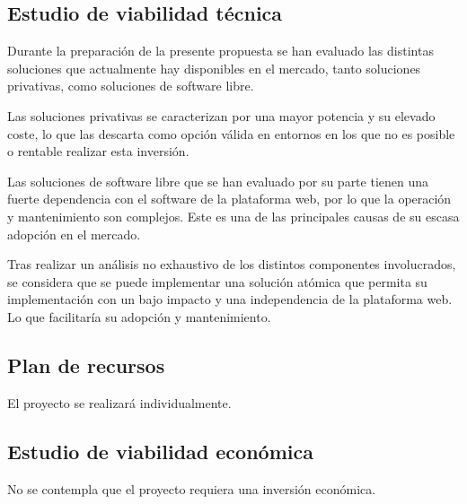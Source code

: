 \subsection{Estudio de viabilidad técnica}
\par Durante la preparación de la presente propuesta se han evaluado las distintas soluciones que actualmente hay disponibles en el mercado, tanto soluciones privativas, como soluciones de software libre.
\par Las soluciones privativas se caracterizan por una mayor potencia y su elevado coste, lo que las descarta como opción válida en entornos en los que no es posible o rentable realizar esta inversión.
\par Las soluciones de software libre que se han evaluado por su parte tienen una fuerte dependencia con el software de la plataforma web, por lo que la operación y mantenimiento son complejos. Este es una de las
principales causas de su escasa adopción en el mercado.
\par Tras realizar un análisis no exhaustivo de los distintos componentes involucrados, se considera que se puede implementar una solución atómica que permita su implementación con un bajo impacto y una independencia de la
plataforma web. Lo que facilitaría su adopción y mantenimiento.

\subsection{Plan de recursos}
\par El proyecto se realizará individualmente.

\subsection{Estudio de viabilidad económica}
\par No se contempla que el proyecto requiera una inversión económica.

